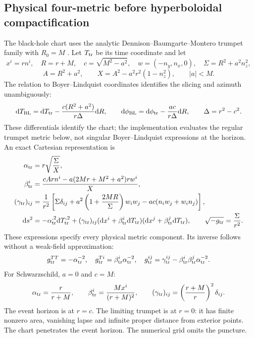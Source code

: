 \documentclass[11pt,letterpaper]{article}
\newcommand{\dd}{\mathrm{d}}
\begin{document}
\subsection{Physical four-metric before hyperboloidal compactification}
The black-hole chart uses the analytic Dennison--Baumgarte--Montero trumpet family with $R_0=M$ \cite{trumpet}. Let $T_{\rm tr}$ be its time coordinate and let
\begin{equation}
 x^i=r n^i,\quad R=r+M,\quad c=\sqrt{M^2-a^2},\quad
 w=(-n_y,n_x,0),\quad \Sigma=R^2+a^2n_z^2,
\end{equation}
\begin{equation}
 A=R^2+a^2,\qquad X=A^2-a^2r^2(1-n_z^2),\qquad |a|<M.
\end{equation}
The relation to Boyer--Lindquist coordinates identifies the slicing and azimuth unambiguously:
\begin{equation}
 \dd T_{\rm BL}=\dd T_{\rm tr}-\frac{c(R^2+a^2)}{r\Delta}\dd R,\qquad
 \dd\phi_{\rm BL}=\dd\phi_{\rm tr}-\frac{ac}{r\Delta}\dd R,\qquad
 \Delta=r^2-c^2.
\end{equation}
These differentials identify the chart; the implementation evaluates the regular trumpet metric below, not singular Boyer--Lindquist expressions at the horizon.
An exact Cartesian representation is
\begin{align}
 \alpha_{\rm tr}&=r\sqrt{\frac{\Sigma}{X}},\\
 \beta^i_{\rm tr}&=\frac{cAr n^i-a(2Mr+M^2+a^2)r w^i}{X},\\
 (\gamma_{\rm tr})_{ij}&=\frac{1}{r^2}\left[\Sigma\delta_{ij}
 +a^2\left(1+\frac{2MR}{\Sigma}\right)w_iw_j
 -ac(n_iw_j+w_in_j)\right],\\
 \dd s^2&=-\alpha_{\rm tr}^{,2}\dd T_{\rm tr}^{,2}
 +(\gamma_{\rm tr})_{ij}(\dd x^i+\beta^i_{\rm tr}\dd T_{\rm tr})
 (\dd x^j+\beta^j_{\rm tr}\dd T_{\rm tr}),\qquad
 \sqrt{-g_{\rm tr}}=\frac{\Sigma}{r^2}.
\end{align}
These expressions specify every physical metric component. Its inverse follows without a weak-field approximation:
\begin{equation}
 g^{TT}_{\rm tr}=-\alpha_{\rm tr}^{-2},\quad
 g^{Ti}_{\rm tr}=\beta^i_{\rm tr}\alpha_{\rm tr}^{-2},\quad
 g^{ij}_{\rm tr}=\gamma_{\rm tr}^{ij}-\beta^i_{\rm tr}\beta^j_{\rm tr}\alpha_{\rm tr}^{-2}.
\end{equation}
For Schwarzschild, $a=0$ and $c=M$:
\begin{equation}
 \alpha_{\rm tr}=\frac{r}{r+M},\qquad
 \beta^i_{\rm tr}=\frac{Mx^i}{(r+M)^2},\qquad
 (\gamma_{\rm tr})_{ij}=\left(\frac{r+M}{r}\right)^2\delta_{ij}.
\end{equation}
The event horizon is at $r=c$. The limiting trumpet is at $r=0$: it has finite nonzero area, vanishing lapse and infinite proper distance from exterior points. The chart penetrates the event horizon. The numerical grid omits the puncture.
\end{document}

